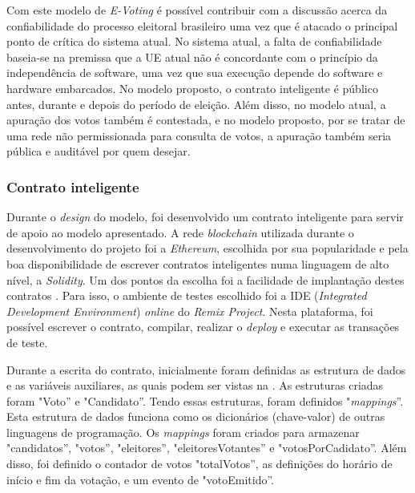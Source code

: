 \documentclass[portuguese]{textolivre}
\begin{document}
	Com este modelo de \textit{E-Voting} é possível contribuir com a discussão acerca da confiabilidade do processo eleitoral brasileiro uma vez que é atacado o principal ponto de crítica do sistema atual. No sistema atual, a falta de confiabilidade baseia-se na premissa que a UE atual não é concordante com o princípio da independência de software, uma vez que sua execução depende do software e hardware embarcados. No modelo proposto, o contrato inteligente é público antes, durante e depois do período de eleição. Além disso, no modelo atual, a apuração dos votos também é contestada, e no modelo proposto, por se tratar de uma rede não permissionada para consulta de votos, a apuração também seria pública e auditável por quem desejar.
	
	
	
	\subsubsection{Contrato inteligente}\label{exemplo-contrato}
	
	Durante o \textit{design} do modelo, foi desenvolvido um contrato inteligente para servir de apoio ao modelo apresentado. 
	A rede \emph{blockchain} utilizada durante o desenvolvimento do projeto foi a \emph{Ethereum}, escolhida por sua popularidade e pela boa disponibilidade de escrever contratos inteligentes numa linguagem de alto nível, a \textit{Solidity}.  Um dos pontos da escolha foi a facilidade de implantação destes contratos \cite{dannen2017introducing}. Para isso, o ambiente de testes escolhido foi a IDE (\textit{Integrated Development Environment}) \textit{online} do \textit{Remix Project}. Nesta plataforma, foi possível escrever o contrato, compilar, realizar o \textit{deploy} e executar as transações de teste. 
	
	Durante a escrita do contrato, inicialmente foram definidas as estrutura de dados e as variáveis auxiliares, as quais podem ser vistas na . As estruturas criadas foram "Voto'' e "Candidato''. Tendo essas estruturas, foram definidos "\emph{mappings}''. Esta estrutura de dados funciona como os dicionários (chave-valor) de outras linguagens de programação. Os \textit{mappings} foram criados para armazenar "candidatos'', "votos'', "eleitores'', "eleitoresVotantes'' e "votosPorCadidato''. Além disso, foi definido o contador de votos "totalVotos'', as definições do horário de início e fim da votação, e um evento de "votoEmitido''. 
	
	
\end{document}
